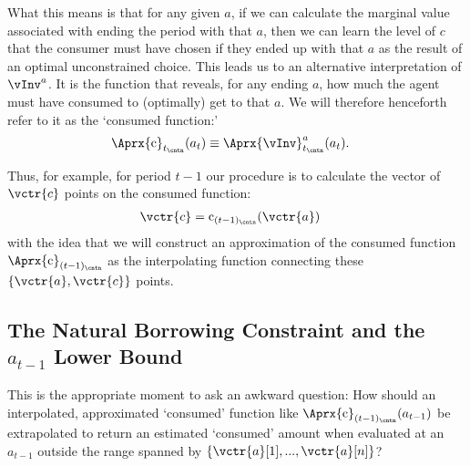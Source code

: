 \documentclass[titlepage, headings=optiontotocandhead]{Resources/texmf-local/tex/latex/econtex}
\begin{document}
What this means is that for any given $a$, if we can calculate the marginal value associated with ending the period with that $a$, then we can learn the level of $c$ that the consumer must have chosen if they ended up with that $a$ as the result of an optimal unconstrained choice.  This leads us to an alternative interpretation of $\vInv^{a}$. It is the function that reveals, for any ending $a$, how much the agent must have consumed to (optimally) get to that $a$.  We will therefore henceforth refer to it as the `consumed function:'
\begin{equation}\begin{gathered}\begin{aligned}
      \Aprx{\cFunc}_{t_\cntn}(a_{t}) & \equiv \Aprx{\vInv}^{a}_{t_\cntn}(a_{t}) \label{eq:consumedfn}.    
    \end{aligned}\end{gathered}\end{equation}

Thus, for example, for period $t-1$ our procedure is to calculate the vector of $\vctr{c}$ points on the consumed function:
\begin{equation}\begin{gathered}\begin{aligned}
      \vctr{c} & = \cFunc_{(t-1)_\cntn}(\vctr{a}) \label{eq:consumedfnvecs}     
    \end{aligned}\end{gathered}\end{equation}
with the idea that we will construct an approximation of the consumed function $\Aprx{\cFunc}_{(t-1)_\cntn}$ as the interpolating function connecting these $\{\vctr{a},\vctr{c}\}$ points.

\hypertarget{the-natural-borrowing-constraint-and-the-a-lower-bound}{}
\subsection{The Natural Borrowing Constraint and the $a_{t-1}$ Lower Bound} \label{subsec:LiqConstrSelfImposed}

This is the appropriate moment to ask an awkward question: How should an interpolated, approximated `consumed' function like $\Aprx{\cFunc}_{(t-1)_\cntn}(a_{t-1})$ be extrapolated to return an estimated `consumed' amount when evaluated at an $a_{t-1}$ outside the range spanned by $\{\vctr{a}[1],...,\vctr{a}[n]\}$?
\end{document}
